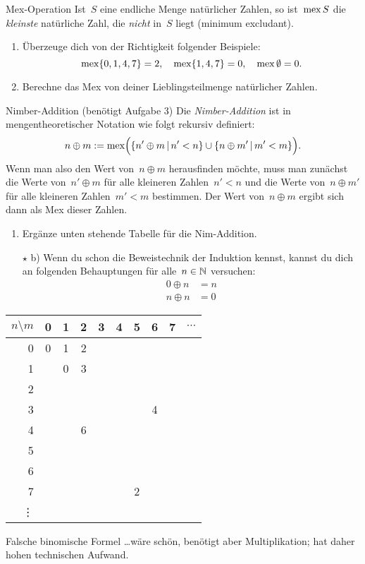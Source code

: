 \documentclass{zirkelblatt}
\begin{document}
\begin{aufgabe}{Mex-Operation}
Ist~$S$ eine endliche Menge natürlicher Zahlen, so ist~$\operatorname{mex} S$ die \emph{kleinste}
natürliche Zahl, die \emph{nicht} in~$S$ liegt (minimum excludant).
\begin{enumerate}
\item Überzeuge dich von der Richtigkeit folgender Beispiele:
\[
  \operatorname{mex} \{ 0,1,4,7 \} = 2, \quad
  \operatorname{mex} \{ 1,4,7 \} = 0, \quad
  \operatorname{mex} \emptyset = 0. \]
\item Berechne das Mex von deiner Lieblingsteilmenge natürlicher Zahlen.
\end{enumerate}
\end{aufgabe}

\begin{aufgabe}{Nimber-Addition (benötigt Aufgabe 3)}
Die \emph{Nimber-Addition} ist in mengentheoretischer Notation wie folgt rekursiv definiert:
\[ n \oplus m := \operatorname{mex}\Bigl(\left\{n' \oplus m \,|\, n' < n\right\} \cup
\left\{n \oplus m' \,|\, m' < m\right\}\Bigr). \]
Wenn man also den Wert von~$n \oplus m$ herausfinden möchte, muss man zunächst
die Werte von~$n' \oplus m$ für alle kleineren Zahlen~$n' < n$ und die Werte
von~$n \oplus m'$ für alle kleineren Zahlen~$m' < m$ bestimmen. Der Wert
von~$n \oplus m$ ergibt sich dann als Mex dieser Zahlen.
\begin{enumerate}
\item Ergänze unten stehende Tabelle für die Nim-Addition.
\item[$\star$ b)] Wenn du schon die Beweistechnik der Induktion kennst, kannst
du dich an folgenden Behauptungen für alle~$n \in \mathbb{N}$ versuchen:
\begin{align*}
  0 \oplus n &= n \\
  n \oplus n &= 0
\end{align*}
\end{enumerate}
\begin{center}
  \begin{tabular}{r|ccccccccl}
    $n \setminus m$ & 0 & 1 & 2 & 3 & 4 & 5 & 6 & 7 & $\cdots$ \\\hline
    0 & 0 & 1 & 2 \\
    1 &   & 0 & 3 \\
    2 & \\
    3 & & & & & & & 4 \\
    4 & & & 6 \\
    5 & \\
    6 & \\
    7 & & & & & & 2 \\
    \vdots
  \end{tabular}
\end{center}
\end{aufgabe}

\begin{aufgabe}{Falsche binomische Formel}
\ldots wäre schön, benötigt aber Multiplikation; hat daher hohen technischen
Aufwand.
\end{aufgabe}
\end{document}
